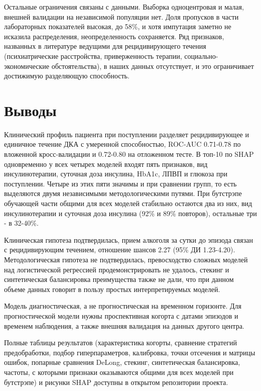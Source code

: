 \documentclass[pdflatex,sn-basic,Numbered]{sn-jnl}
\begin{document}
Остальные ограничения связаны с данными. Выборка одноцентровая и малая, внешней валидации на независимой популяции нет. Доля пропусков в части лабораторных показателей высокая, до 58\%, и хотя импутация заметно не исказила распределения, неопределенность сохраняется. Ряд признаков, названных в литературе ведущими для рецидивирующего течения (психиатрические расстройства, приверженность терапии, социально-экономические обстоятельства), в наших данных отсутствует, и это ограничивает достижимую разделяющую способность.

\section{Выводы}\label{sec6}

Клинический профиль пациента при поступлении разделяет рецидивирующее и единичное течение ДКА с умеренной способностью, ROC-AUC 0.71-0.78 по вложенной кросс-валидации и 0.72-0.80 на отложенном тесте. В топ-10 по SHAP одновременно у всех четырех моделей входят пять признаков, вид инсулинотерапии, суточная доза инсулина, HbA1c, ЛПВП и глюкоза при поступлении. Четыре из этих пяти значимы и при сравнении групп, то есть выделяются двумя независимыми методологическими путями. При бутстрэпе обучающей части общими для всех моделей стабильно остаются два из них, вид инсулинотерапии и суточная доза инсулина (92\% и 89\% повторов), остальные три - в 32-40\%.

Клиническая гипотеза подтвердилась, прием алкоголя за сутки до эпизода связан с рецидивирующим течением, отношение шансов 2.27 (95\% ДИ 1.23-4.20). Методологическая гипотеза не подтвердилась, превосходство сложных моделей над логистической регрессией продемонстрировать не удалось, стекинг и синтетическая балансировка преимущества также не дали, что при данном объеме данных говорит в пользу простых интерпретируемых моделей.

Модель диагностическая, а не прогностическая на временном горизонте. Для прогностической модели нужны проспективная когорта с датами эпизодов и временем наблюдения, а также внешняя валидация на данных другого центра.

\backmatter


Полные таблицы результатов (характеристика когорты, сравнение стратегий предобработки, подбор гиперпараметров, калибровка, точки отсечения и матрицы ошибок, попарные сравнения DeLong, стекинг, синтетическая балансировка, частоты, с которыми признаки оказываются общими для всех моделей при бутстрэпе) и рисунки SHAP доступны в открытом репозитории проекта.
\end{document}
